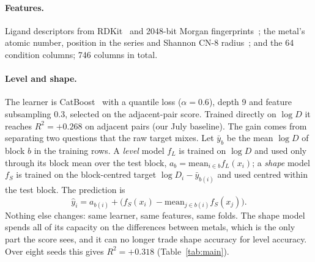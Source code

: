 \documentclass{article}
\begin{document}
\paragraph{Features.}
Ligand descriptors from RDKit~\cite{rdkit} and 2048-bit Morgan fingerprints~\cite{rogers2010}; the metal's atomic number, position in the series and Shannon CN-8 radius~\cite{shannon1976}; and the 64 condition columns; 746 columns in total.

\paragraph{Level and shape.}
The learner is CatBoost~\cite{catboost2018} with a quantile loss ($\alpha = 0.6$), depth 9 and feature subsampling 0.3, selected on the adjacent-pair score.
Trained directly on $\log D$ it reaches $R^2 = +0.268$ on adjacent pairs (our July baseline).
The gain comes from separating two questions that the raw target mixes.
Let $\bar y_b$ be the mean $\log D$ of block $b$ in the training rows.
A \emph{level} model $f_L$ is trained on $\log D$ and used only through its block mean over the test block, $a_b = \mathrm{mean}_{i \in b} f_L(x_i)$; a \emph{shape} model $f_S$ is trained on the block-centred target $\log D_i - \bar y_{b(i)}$ and used centred within the test block.
The prediction is
\begin{equation}
	\hat y_i = a_{b(i)} + \big(f_S(x_i) - \mathrm{mean}_{j \in b(i)} f_S(x_j)\big).
	\label{eq:anchored}
\end{equation}
Nothing else changes: same learner, same features, same folds.
The shape model spends all of its capacity on the differences between metals, which is the only part the score sees, and it can no longer trade shape accuracy for level accuracy.
Over eight seeds this gives $R^2 = +0.318$ (Table~\ref{tab:main}).
\end{document}
